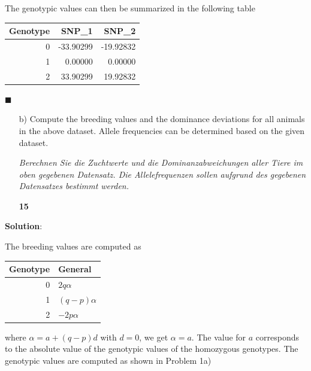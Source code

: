 \documentclass[
]{article}
\newenvironment{Shaded}{\begin{snugshade}}{\end{snugshade}}
\newcommand{\AttributeTok}[1]{\textcolor[rgb]{0.77,0.63,0.00}{#1}}
\newcommand{\FunctionTok}[1]{\textcolor[rgb]{0.00,0.00,0.00}{#1}}
\newcommand{\NormalTok}[1]{#1}
\newcommand{\OtherTok}[1]{\textcolor[rgb]{0.56,0.35,0.01}{#1}}
\newcommand{\SpecialCharTok}[1]{\textcolor[rgb]{0.00,0.00,0.00}{#1}}
\newcommand{\StringTok}[1]{\textcolor[rgb]{0.31,0.60,0.02}{#1}}
\newcommand{\points}[1]
{\begin{flushright}\textbf{#1}\end{flushright}}
\newcommand{\solstart}
{\vspace{3ex}\textbf{Solution}:}
\newcommand{\solend}
{\vspace{2ex}$\blacksquare$}
\begin{document}
The genotypic values can then be summarized in the following table

\begin{longtable}[]{@{}rrr@{}}
\toprule()
Genotype & SNP\_1 & SNP\_2 \\
\midrule()
\endhead
0 & -33.90299 & -19.92832 \\
1 & 0.00000 & 0.00000 \\
2 & 33.90299 & 19.92832 \\
\bottomrule()
\end{longtable}

\solend

\clearpage
\pagebreak

\begin{enumerate}
\item[b)] Compute the breeding values and the dominance deviations for all animals in the above dataset. Allele frequencies can be determined based on the given dataset.

\textit{Berechnen Sie die Zuchtwerte und die Dominanzabweichungen aller Tiere im oben gegebenen Datensatz. Die Allelefrequenzen sollen aufgrund des gegebenen Datensatzes bestimmt werden.}
\points{15}
\end{enumerate}

\solstart

The breeding values are computed as

\begin{longtable}[]{@{}rl@{}}
\toprule()
Genotype & General \\
\midrule()
\endhead
0 & \(2q \alpha\) \\
1 & \((q-p) \alpha\) \\
2 & \(-2p \alpha\) \\
\bottomrule()
\end{longtable}

where \(\alpha = a + (q-p)d\) with \(d=0\), we get \(\alpha = a\). The
value for \(a\) corresponds to the absolute value of the genotypic
values of the homozygous genotypes. The genotypic values are computed as
shown in Problem 1a)

\begin{Shaded}
\end{Shaded}
\end{document}
